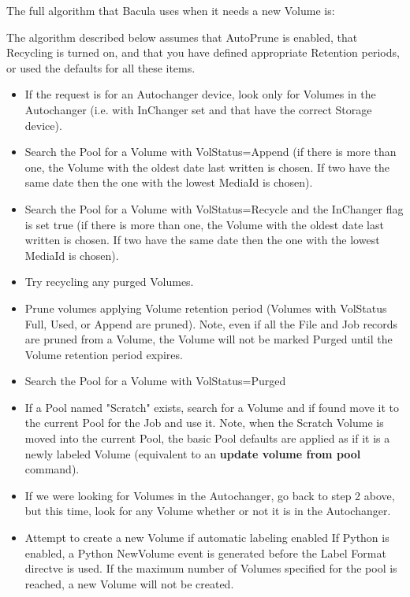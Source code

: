The full algorithm that Bacula uses when it needs a new Volume is: 

The algorithm described below assumes that AutoPrune is enabled,
that Recycling is turned on, and that you have defined
appropriate Retention periods, or used the defaults for all these
items. 

\begin{itemize}
\item If the request is for an Autochanger device, look only
   for Volumes in the Autochanger (i.e. with InChanger set and that have
   the correct Storage device).        
\item Search the Pool for a Volume with VolStatus=Append (if there is more
   than one, the Volume with the oldest date last written is chosen.  If
   two have the same date then the one with the lowest MediaId is chosen).
\item Search the Pool for a Volume with VolStatus=Recycle and the InChanger
   flag is set true (if there is more than one, the Volume with the oldest
   date last written is chosen.  If two have the same date then the one
   with the lowest MediaId is chosen).
\item Try recycling any purged Volumes.
\item Prune volumes applying Volume retention period (Volumes with VolStatus 
   Full, Used, or Append are pruned). Note, even if all the File and Job
   records are pruned from a Volume, the Volume will not be marked Purged
   until the Volume retention period expires.
\item Search the Pool for a Volume with VolStatus=Purged 
\item If a Pool named "Scratch" exists, search for a Volume and if found
   move it to the current Pool for the Job and use it. Note, when
   the Scratch Volume is moved into the current Pool, the basic
   Pool defaults are applied as if it is a newly labeled Volume
   (equivalent to an {\bf update volume from pool} command).
\item If we were looking for Volumes in the Autochanger, go back to
   step 2 above, but this time, look for any Volume whether or not
   it is in the Autochanger.                   
\item Attempt to create a new Volume if automatic labeling enabled 
   If Python is enabled, a Python NewVolume event is generated before
   the Label Format directve is used. If the maximum number of Volumes
   specified for the pool is reached, a new Volume will not be created.

\end{itemize}
